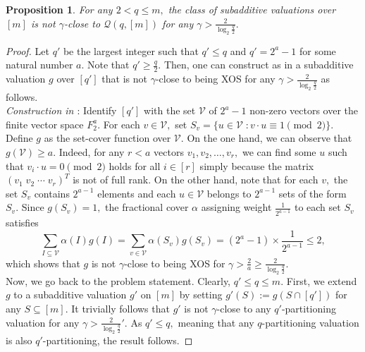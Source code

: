 \documentclass[11pt]{article}%
\newtheorem{proposition}[theorem]{Proposition}
\numberwithin{theorem}{subsection}
\newcommand{\classqm}{\mathcal{Q}(q,[m])}
\begin{document}
\begin{proposition}
\label{lem:salogclose}
For any $2< q \le m,$ the class of subadditive valuations over $[m]$ is not $\gamma$-close to $\classqm$ for any
$\gamma >\frac{2}{\log_2 \frac{q}{2}}.$
\end{proposition}
\begin{proof}
Let $q'$ be the largest integer such that $q'\le q$ and $q' = 2^a - 1$ for some natural number $a.$ Note that $q' \ge \frac{q}{2}.$ Then, one can construct as in \cite[Appendix C]{BhawalkarR11} a subadditive valuation $g$ over $[q']$ that is not $\gamma$-close to being XOS for any $\gamma >\frac{2}{\log_2 \frac{q}{2}}$ as follows.\\

\noindent
\textit{Construction in \cite[Appendix C]{BhawalkarR11}}: 
Identify $[q']$ with the set $\mathcal{V}$ of $2^a-1$ non-zero vectors over the finite vector space $F_2^a.$ For each $v\in \mathcal{V},$ set $S_v= \{u \in \mathcal{V}\; : v\cdot u \equiv 1 \pmod{2}\}.$ Define $g$ as the set-cover function over $\mathcal{V}.$ On the one hand, we can observe that $g(\mathcal{V})\ge a.$ Indeed, for any $r<a$ vectors $v_1, v_2, \ldots, v_r,$ we can find some $u$ such that $v_i \cdot u = 0\pmod{2}$ holds for all $i\in[r]$ simply because the matrix $(v_1\; v_2\;\cdots\; v_r)^T$ is not of full rank. On the other hand, note that for each $v,$ the set $S_v$ contains $2^{a-1}$ elements and each $u\in \mathcal{V}$ belongs to $2^{a-1}$ sets of the form $S_v.$ Since $g(S_v) = 1,$ the fractional cover $\alpha$ assigning weight $\frac{1}{2^{a-1}}$ to each set $S_v$ satisfies 
$$
\sum_{I\subseteq \mathcal{V}} \alpha(I)g(I) = \sum_{v\in \mathcal{V}}
\alpha(S_v)g(S_v) = 
(2^{a}-1)\times \frac{1}{2^{a-1}}\le 2,
$$
which shows that $g$ is not $\gamma$-close to being XOS for $\gamma
>\frac{2}{a}\ge \frac{2}{\log_2 \frac{q}{2}}.$\\ 

\noindent
Now, we go back to the problem statement.
Clearly, $q'\le q\le m.$ First, we extend $g$ to a subadditive valuation $g'$ on $[m]$ by setting $g'(S):= g(S\cap [q'])$ for any $S\subseteq [m].$ It trivially follows that $g'$ is not $\gamma$-close to any $q'$-partitioning valuation for any $\gamma >\frac{2}{\log_2 \frac{q}{2}}'.$ As $q'\le q,$ meaning that any  $q$-partitioning valuation is also $q'$-partitioning, the result follows.
\end{proof}
\end{document}
